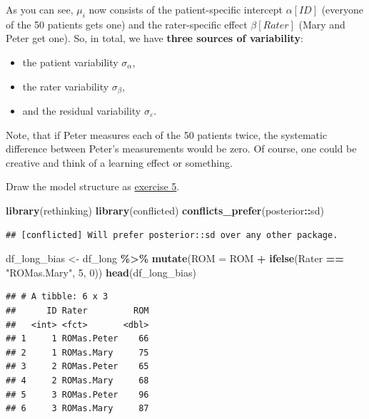 \documentclass[
]{article}
\newenvironment{Shaded}{\begin{snugshade}}{\end{snugshade}}
\newcommand{\AttributeTok}[1]{\textcolor[rgb]{0.13,0.29,0.53}{#1}}
\newcommand{\DecValTok}[1]{\textcolor[rgb]{0.00,0.00,0.81}{#1}}
\newcommand{\FunctionTok}[1]{\textcolor[rgb]{0.13,0.29,0.53}{\textbf{#1}}}
\newcommand{\NormalTok}[1]{#1}
\newcommand{\OtherTok}[1]{\textcolor[rgb]{0.56,0.35,0.01}{#1}}
\newcommand{\SpecialCharTok}[1]{\textcolor[rgb]{0.81,0.36,0.00}{\textbf{#1}}}
\newcommand{\StringTok}[1]{\textcolor[rgb]{0.31,0.60,0.02}{#1}}
\providecommand{\tightlist}{%
  \setlength{\itemsep}{0pt}\setlength{\parskip}{0pt}}
\begin{document}
As you can see, \(\mu_i\) now consists of the patient-specific intercept \(\alpha[ID]\)
(everyone of the 50 patients gets one)
and the rater-specific effect \(\beta[Rater]\) (Mary and Peter get one).
So, in total, we have \textbf{three sources of variability}:

\begin{itemize}
\tightlist
\item
  the patient variability \(\sigma_{\alpha}\),
\item
  the rater variability \(\sigma_{\beta}\),
\item
  and the residual variability \(\sigma_{\varepsilon}\).
\end{itemize}

Note, that if Peter measures each of the 50 patients twice,
the systematic difference between Peter's measurements would
be zero. Of course, one could be creative and think of
a learning effect or something.

Draw the model structure as \hyperref[exercise5]{exercise 5}.

\begin{Shaded}
\begin{Highlighting}[]
\FunctionTok{library}\NormalTok{(rethinking)}
\FunctionTok{library}\NormalTok{(conflicted)}
\FunctionTok{conflicts\_prefer}\NormalTok{(posterior}\SpecialCharTok{::}\NormalTok{sd)}
\end{Highlighting}
\end{Shaded}

\begin{verbatim}
## [conflicted] Will prefer posterior::sd over any other package.
\end{verbatim}

\begin{Shaded}
\begin{Highlighting}[]
\NormalTok{df\_long\_bias }\OtherTok{\textless{}{-}}\NormalTok{ df\_long }\SpecialCharTok{\%\textgreater{}\%}
  \FunctionTok{mutate}\NormalTok{(}\AttributeTok{ROM =}\NormalTok{ ROM }\SpecialCharTok{+} \FunctionTok{ifelse}\NormalTok{(Rater }\SpecialCharTok{==} \StringTok{"ROMas.Mary"}\NormalTok{, }\DecValTok{5}\NormalTok{, }\DecValTok{0}\NormalTok{))}
\FunctionTok{head}\NormalTok{(df\_long\_bias)}
\end{Highlighting}
\end{Shaded}

\begin{verbatim}
## # A tibble: 6 x 3
##      ID Rater         ROM
##   <int> <fct>       <dbl>
## 1     1 ROMas.Peter    66
## 2     1 ROMas.Mary     75
## 3     2 ROMas.Peter    65
## 4     2 ROMas.Mary     68
## 5     3 ROMas.Peter    96
## 6     3 ROMas.Mary     87
\end{verbatim}
\end{document}
